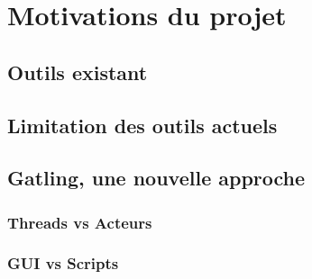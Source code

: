 \section{Motivations du projet}



\subsection{Outils existant}
\subsection{Limitation des outils actuels}
\subsection{Gatling, une nouvelle approche}
\subsubsection{Threads vs Acteurs}
\subsubsection{GUI vs Scripts}